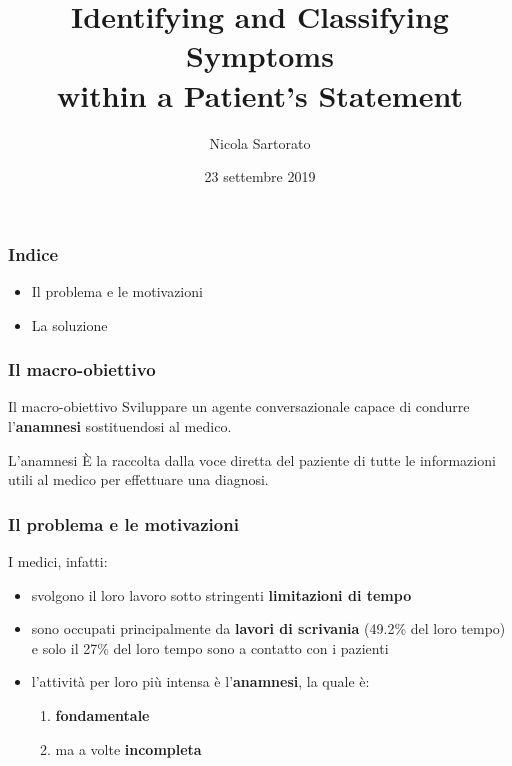 \documentclass{beamer}
\title[Laurea in Informatica]{Identifying and Classifying Symptoms\\within a Patient's Statement}
\author{Nicola Sartorato}
\institute[UNITN]{Universitá di Trento}
\date{23 settembre 2019}
\begin{document}
\frame{\titlepage}


\begin{frame}
\frametitle{Indice}

\begin{itemize}
\setlength\itemsep{1em}
\item Il problema e le motivazioni
\item La soluzione
\end{itemize}

\end{frame}
 
\begin{frame}
\frametitle{Il macro-obiettivo}

\begin{block}{Il macro-obiettivo}
Sviluppare un agente conversazionale capace di condurre l'\textbf{anamnesi} sostituendosi al medico.
\end{block}

\pause

\begin{alertblock}{L'anamnesi}
È la raccolta dalla voce diretta del paziente di tutte le informazioni utili al medico per effettuare una diagnosi.
\end{alertblock}

\end{frame}

\begin{frame}
\frametitle{Il problema e le motivazioni}
I medici, infatti:

\begin{itemize}
 \item<1-> svolgono il loro lavoro sotto stringenti \textbf{limitazioni di tempo} \pause
 \item<2-> sono occupati principalmente da \textbf{lavori di scrivania }(49.2\% del loro tempo) e solo il 27\% del loro tempo sono a contatto con i pazienti \pause
 \item<3-> l'attività per loro più intensa è l'\textbf{anamnesi}, la quale è:
 \begin{enumerate}

  \item<1-> \textbf{fondamentale}\pause
  \item<2-> ma a volte \textbf{incompleta}
 \end{enumerate}
\end{itemize}

\end{frame}
\end{document}
